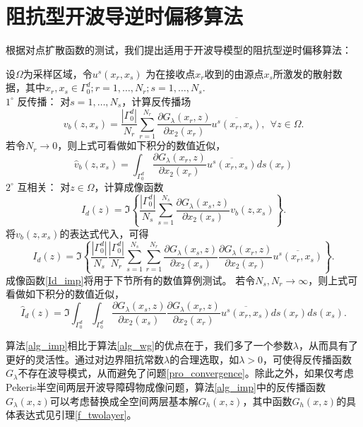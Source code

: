 \section{阻抗型开波导逆时偏移算法}
根据对点扩散函数的测试，我们提出适用于开波导模型的阻抗型逆时偏移算法：
\begin{algorithm}\label{alg_imp}
设$\Omega$为采样区域，令$u^s(x_r,x_s)$ 为在接收点$x_r$收到的由源点$x_s$所激发的散射数据，其中$x_r,x_s\in\Gamma_0^d;r=1,\ldots,N_r;s=1,\ldots,N_s$.\\
$1^\circ$ 反传播： 对$s=1,\ldots,N_s$，计算反传播场
\begin{equation}
  v_b(z,x_s)=\frac{|\Gamma_0^d|}{N_r}\sum\limits_{r=1}^{N_r}\frac{\partial G_{\lambda}(x_r,z)}{\partial x_2(x_r)}\overline{u^s(x_r,x_s)},\  \  \forall z\in\Omega.
\end{equation}
若令$N_r\rightarrow0$，则上式可看做如下积分的数值近似，
\begin{equation}
  \hat v_b(z,x_s)=\int_{\Gamma_0^d}\frac{\partial G_{\lambda}(x_r,z)}{\partial x_2(x_r)}\overline{u^s(x_r,x_s)}ds(x_r)
\end{equation}
$2^\circ$ 互相关： 对$z\in\Omega$，计算成像函数
\begin{equation*}
  I_d(z)=\Im\left\{\frac{|\Gamma_0^d|}{N_s}\sum\limits_{s=1}^{N_s}\frac{\partial G_{\lambda}(x_s,z)}{\partial x_2(x_s)}v_b(z,x_s)
  \right\}.
\end{equation*}
将$v_b(z,x_s)$的表达式代入，可得
\begin{equation}\label{Id_imp}
  I_d(z)=\Im\left\{\frac{|\Gamma_0^d|}{N_s}\frac{|\Gamma_0^d|}{N_r}\sum\limits_{s=1}^{N_s}\sum\limits_{r=1}^{N_r}\frac{\partial G_{\lambda}(x_s,z)}{\partial x_2(x_s)}\frac{\partial G_{\lambda}(x_r,z)}{\partial x_2(x_r)}\overline{u^s(x_r,x_s)}
  \right\}.
\end{equation}
成像函数\eqref{Id_imp}将用于下节所有的数值算例测试。
若令$N_s,N_r\rightarrow\infty$，则上式可看做如下积分的数值近似，
\begin{equation}\label{Idhat_imp}
  \hat I_d(z)=\Im\int_{\Gamma_0^d}\int_{\Gamma_0^d}\frac{\partial G_{\lambda}(x_s,z)}{\partial x_2(x_s)}
  \frac{\partial G_{\lambda}(x_r,z)}{\partial x_2(x_r)}\overline{u^s(x_r,x_s)}ds(x_r)ds(x_s).
\end{equation}
\end{algorithm}

\begin{remark}
算法\ref{alg_imp}相比于算法\ref{alg_wg}的优点在于，我们多了一个参数$\lambda$，从而具有了更好的灵活性。通过对边界阻抗常数$\lambda$的合理选取，如$\lambda>0$，可使得反传播函数$G_{\lambda}$不存在波导模式，从而避免了问题\ref{pro_convergence}。除此之外，如果仅考虑Pekeris半空间两层开波导障碍物成像问题，算法\ref{alg_imp}中的反传播函数$G_{\lambda}(x,z)$可以考虑替换成全空间两层基本解$G_h(x,z)$，其中函数$G_h(x,z)$的具体表达式见引理\ref{f_twolayer}。
\end{remark}
